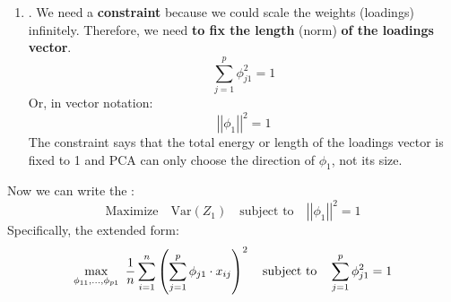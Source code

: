 \begin{enumerate}
    \item {}. We need a \textbf{constraint} because we could scale the weights (loadings) infinitely. Therefore, we need \textbf{to fix the length} (norm) \textbf{of the loadings vector}.
    \begin{equation*}
        \displaystyle\sum_{j=1}^{p} \phi_{j1}^{2} = 1
    \end{equation*}
    Or, in vector notation:
    \begin{equation*}
        \left|\left|\phi_{1}\right|\right|^{2} = 1
    \end{equation*}
    The constraint says that the total energy or length of the loadings vector is fixed to 1 and PCA can only choose the direction of $\phi_{1}$, not its size.
\end{enumerate}
Now we can write the :
\begin{equation}
    \text{Maximize} \hspace{1em} \text{Var}\left(Z_{1}\right) \hspace{1em} \text{subject to} \hspace{1em} \left|\left|\phi_{1}\right|\right|^{2} = 1
\end{equation}
Specifically, the extended form:
\begin{equation}
    \underset{\phi_{11}, \dots, \phi_{p1}}{\max} \hspace{.5em} \dfrac{1}{n}\displaystyle\sum_{i=1}^{n} \left(\displaystyle\sum_{j=1}^{p} \phi_{j1} \cdot x_{ij}\right)^{2} \hspace{1em} \text{subject to} \hspace{1em} \displaystyle\sum_{j=1}^{p} \phi_{j1}^{2} = 1
\end{equation}

\newpage

